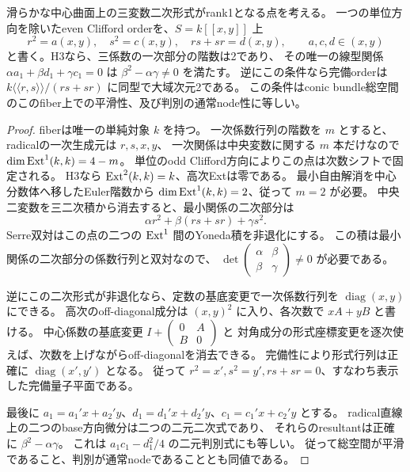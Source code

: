\begin{lemma}
\label{lem:h3-order2-local-conic-criterion}
滑らかな中心曲面上の三変数二次形式がrank1となる点を考える。
一つの単位方向を除いたeven Clifford orderを、$S=k[[x,y]]$ 上
\[
 r^2=a(x,y),\quad s^2=c(x,y),\quad rs+sr=d(x,y),
 \qquad a,c,d\in(x,y)
\]
と書く。H3なら、三係数の一次部分の階数は2であり、
その唯一の線型関係 $\alpha a_1+\beta d_1+\gamma c_1=0$ は
$\beta^2-\alpha\gamma\ne0$ を満たす。
逆にこの条件なら完備orderは $k\langle\!\langle r,s\rangle\!\rangle/(rs+sr)$
に同型で大域次元2である。
この条件はconic bundle総空間のこのfiber上での平滑性、及び判別の通常node性に等しい。
\end{lemma}
\begin{proof}
fiberは唯一の単純対象 $k$ を持つ。
一次係数行列の階数を $m$ とすると、radicalの一次生成元は $r,s,x,y$、
一次関係は中央変数に関する $m$ 本だけなので $\dim\operatorname{Ext}^1(k,k)=4-m$。
単位のodd Clifford方向によりこの点は次数シフトで固定される。
H3なら $\operatorname{Ext}^2(k,k)=k$、高次Extは零である。
最小自由解消を中心分数体へ移したEuler階数から $\dim\operatorname{Ext}^1(k,k)=2$、従って $m=2$ が必要。
中央二変数を三二次積から消去すると、最小関係の二次部分は
\[
 \alpha r^2+\beta(rs+sr)+\gamma s^2.
\]
Serre双対はこの点の二つの $\operatorname{Ext}^1$ 間のYoneda積を非退化にする。
この積は最小関係の二次部分の係数行列と双対なので、
$\det\left(\begin{smallmatrix}\alpha&\beta\\\beta&\gamma\end{smallmatrix}\right)\ne0$ が必要である。

逆にこの二次形式が非退化なら、定数の基底変更で一次係数行列を
$\operatorname{diag}(x,y)$ にできる。
高次のoff-diagonal成分は $(x,y)^2$ に入り、各次数で $xA+yB$ と書ける。
中心係数の基底変更 $I+\left(\begin{smallmatrix}0&A\\B&0\end{smallmatrix}\right)$ と
対角成分の形式座標変更を逐次使えば、次数を上げながらoff-diagonalを消去できる。
完備性により形式行列は正確に $\operatorname{diag}(x',y')$ となる。
従って $r^2=x',s^2=y',rs+sr=0$、すなわち表示した完備量子平面である。

最後に $a_1=a_1'x+a_2'y$、$d_1=d_1'x+d_2'y$、$c_1=c_1'x+c_2'y$ とする。
radical直線上の二つのbase方向微分は二つの二元二次式であり、
それらのresultantは正確に $\beta^2-\alpha\gamma$。
これは $a_1c_1-d_1^2/4$ の二元判別式にも等しい。
従って総空間が平滑であること、判別が通常nodeであることとも同値である。
\end{proof}

